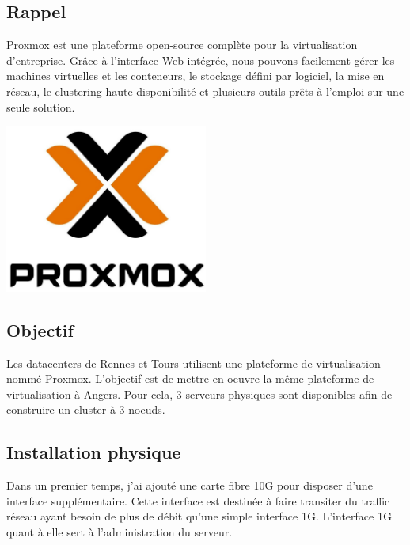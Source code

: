 \documentclass[12pt]{article}
\begin{document}
\subsection{Rappel}
\noindent%
\begin{minipage}{.7\textwidth}%
\gls{Proxmox} est une plateforme open-source complète pour la virtualisation d'entreprise. 
Grâce à l'interface Web intégrée, nous pouvons facilement gérer les machines virtuelles et les conteneurs, le stockage défini par logiciel, la mise en réseau, le clustering haute disponibilité et plusieurs outils prêts à l'emploi sur une seule solution.

\end{minipage}%
\hfill
\begin{minipage}{.3\textwidth}%
\begin{center}
\includegraphics[width=0.5\textwidth]{src/logo_proxmox.jpg}
\end{center}
\end{minipage}%


\subsection{Objectif}
Les datacenters de Rennes et Tours utilisent une plateforme de virtualisation nommé \gls{Proxmox}. 
L'objectif est de mettre en oeuvre la même plateforme de virtualisation à Angers. 
Pour cela, 3 serveurs physiques sont disponibles afin de construire un \gls{cluster} à 3 noeuds.

\subsection{Installation physique}
Dans un premier temps, j'ai ajouté une carte fibre 10G pour disposer d'une interface supplémentaire. 
Cette interface est destinée à faire transiter du traffic réseau ayant besoin de plus de débit qu'une simple interface 1G. 
L'interface 1G quant à elle sert à l'administration du serveur.
\end{document}
